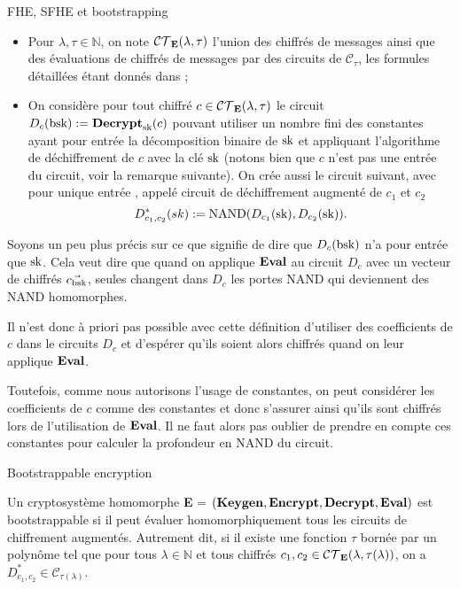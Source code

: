 \begin{section}{FHE, SFHE et bootstrapping}
\begin{itemize}
\item Pour $\lambda, \tau \in \mathbb{N}$, on note
$\mathcal{CT}_{\text{\textbf{E}}}(\lambda,\tau)$ l'union des chiffrés de messages 
ainsi que des évaluations de chiffrés de messages par des circuits de 
$\mathcal{C}_\tau$, les formules détaillées étant donnés dans \cite{halevi};
\item On considère pour tout chiffré $c\in\mathcal{CT}_{\text{\textbf{E}}}(\lambda,\tau)$ 
le circuit $D_c(\text{bsk}) := \text{\textbf{Decrypt}}_{\text{sk}}(c)$ pouvant utiliser un nombre fini des constantes
ayant pour entrée la décomposition binaire 
de $\text{sk}$ et appliquant l'algorithme de déchiffrement de $c$ avec la clé $\text{sk}$ (notons bien que $c$ n'est pas une entrée
du circuit, voir la remarque suivante). On crée aussi le circuit suivant, avec pour
unique entrée \sk, appelé circuit de déchiffrement augmenté de $c_1$ et $c_2$
\[ D^*_{c_1,c_2}(sk) := \text{NAND}(D_{c_1}(\text{sk}), D_{c_2}(\text{sk})).\]
\end{itemize}
\begin{rmq}
Soyons un peu plus précis sur ce que signifie de dire que $D_c(\text{bsk})$
n'a pour entrée que $\text{sk}$. Cela veut dire que quand on applique 
$\text{\textbf{Eval}}$ au circuit $D_c$ avec un vecteur de chiffrés $\vec{c_{\text{bsk}}}$,
seules changent dans $D_c$ les portes NAND qui deviennent des 
NAND homomorphes. 

Il n'est donc à priori pas possible avec cette définition 
d'utiliser des coefficients de $c$ dans le circuits $D_c$ 
et d'espérer qu'ils soient alors chiffrés quand on leur applique $\text{\textbf{Eval}}$.


Toutefois, comme nous autorisons l'usage de constantes, on peut 
considérer les coefficients de $c$ comme des constantes et donc 
s'assurer ainsi qu'ils sont chiffrés lors de l'utilisation de $\text{\textbf{Eval}}$. 
Il ne faut alors pas oublier de prendre en compte ces constantes pour 
calculer la profondeur en NAND du circuit.
\end{rmq}

\begin{definition}{Bootstrappable encryption}

Un cryptosystème homomorphe
\textbf{E} = $(\text{\textbf{Keygen}}, \text{\textbf{Encrypt}}, \text{\textbf{Decrypt}}, \text{\textbf{Eval}})$
est bootstrappable si il peut évaluer homomorphiquement tous les circuits 
de chiffrement augmentés. Autrement dit, si il existe une fonction $\tau$
bornée par un polynôme tel que pour tous $\lambda \in \mathbb{N}$ et tous
chiffrés  $c_1, c_2 \in \mathcal{CT}_{\text{\textbf{E}}}(\lambda, \tau(\lambda))$, on a
$D^*_{c_1,c_2} \in \mathcal{C}_{\tau(\lambda)}$.
\end{definition}


\end{section}
